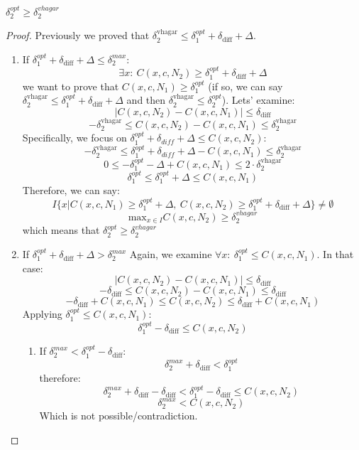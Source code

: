 \begin{lemma}
$\delta_2^{opt} \geq \delta^{vhagar}_2$
\end{lemma}
\begin{proof}
Previously we proved that $\delta_2^{\text{vhagar}} \leq \delta_1^{opt}+\delta_{\text{diff}}+\Delta$.\\
\begin{enumerate}
    \item If $\delta_1^{opt}+\delta_{\text{diff}}+\Delta \leq \delta_2^{max}$:
    $$\exists{x}:\ C(x,c,N_2) \geq \delta_1^{opt}+\delta_{\text{diff}}+\Delta$$
    we want to prove that $C(x,c,N_1) \geq \delta_1^{opt}$ (if so, we can say $\delta_2^{\text{vhagar}} \leq  \delta_1^{opt}+\delta_{\text{diff}}+\Delta$ and then $\delta_2^{\text{vhagar}} \leq \delta_2^{opt}$). Lets' examine:
    $$|C(x,c,N_2)-C(x,c,N_1)| \leq \delta_{\text{diff}}$$
    $$ -\delta_2^{\text{vhagar}} \leq C(x,c,N_2)-C(x,c,N_1) \leq \delta_2^{\text{vhagar}} $$
    Specifically, we focus on $\delta_1^{opt}+\delta_{diff}+\Delta \leq C(x,c,N_2)$:
    $$  -\delta_2^{\text{vhagar}} \leq \delta_1^{opt}+\delta_{diff}+\Delta-C(x,c,N_1) \leq \delta_2^{\text{vhagar}} $$
    $$  0 \leq -\delta_1^{opt}-\Delta+C(x,c,N_1) \leq 2\cdot\delta_2^{\text{vhagar}} $$
    $$ \delta_1^{opt} \leq \delta_1^{opt} + \Delta \leq C(x,c,N_1) $$
    Therefore, we can say:
    $$I\{x| C(x,c,N_1)\geq\delta_1^{opt} + \Delta,\ C(x,c,N_2)\geq \delta_1^{opt}+\delta_{\text{diff}}+\Delta\}\ne\emptyset$$
    $$\text{max}_{x\in{I}}{C(x,c,N_2)} \geq \delta_2^{vhagar}$$
    which means that $\delta_2^{opt} \geq \delta_2^{vhagar}$
    
    \item If $\delta_1^{opt}+\delta_{\text{diff}}+\Delta > \delta_2^{max}$
    Again, we examine $\forall{x}:\ \delta_1^{opt} \leq C(x,c,N_1)$. In that case:
    $$|C(x,c,N_2)-C(x,c,N_1)| \leq \delta_{\text{diff}}$$
    $$-\delta_{\text{diff}} \leq C(x,c,N_2)-C(x,c,N_1) \leq \delta_{\text{diff}}$$
    $$-\delta_{\text{diff}}+C(x,c,N_1) \leq C(x,c,N_2) \leq \delta_{\text{diff}}+C(x,c,N_1)$$
    Applying $\delta_1^{opt} \leq C(x,c,N_1)$:
    $$\delta_1^{opt}-\delta_{\text{diff}} \leq C(x,c,N_2)$$
    
    \begin{enumerate}
    \item If $\delta_2^{max} < \delta_1^{opt} - \delta_\text{diff}$:
    $$ \delta_2^{max}+\delta_\text{diff} < \delta_1^{opt}$$
    therefore:
    $$ \delta_2^{max}+\delta_\text{diff} - \delta_{\text{diff}}< \delta_1^{opt}-\delta_{\text{diff}} \leq C(x,c,N_2) $$
    $$ \delta_2^{max} < C(x,c,N_2) $$
    Which is not possible/contradiction.
    

\end{enumerate}
\end{enumerate}
\end{proof}

